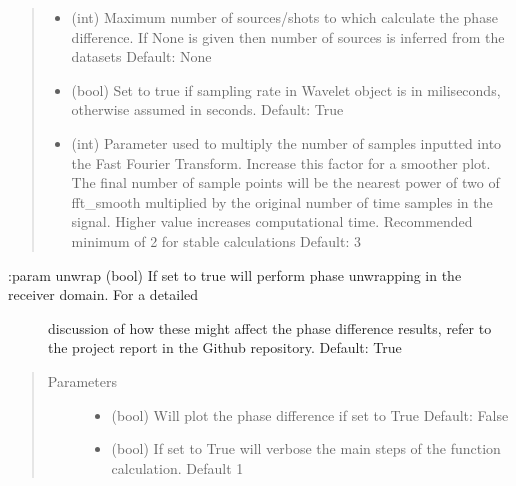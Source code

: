 \documentclass[letterpaper,10pt,english]{sphinxmanual}
\begin{document}
\begin{fulllineitems}
\begin{quote}
\begin{description}
\begin{itemize}
\item {} 
 \textendash{} (int)       Maximum number of sources/shots to which calculate the phase difference. If None is
given then number of sources is inferred from the datasets
Default: None

\item {} 
 \textendash{} (bool)      Set to true if sampling rate in Wavelet object is in miliseconds, otherwise assumed
in seconds.
Default: True

\item {} 
 \textendash{} (int)       Parameter used to multiply the number of samples inputted into the Fast Fourier
Transform. Increase this factor for a smoother plot. The final number of sample
points will be the nearest power of two of fft\_smooth multiplied by the original
number of time samples in the signal. Higher value increases computational time.
Recommended minimum of 2 for stable calculations
Default: 3

\end{itemize}

\end{description}\end{quote}
\begin{description}
\item[{:param unwrap       (bool)      If set to true will perform phase unwrapping in the receiver domain. For a detailed}] \leavevmode
discussion of how these might affect the phase difference results, refer to the
project report in the Github repository.
Default: True

\end{description}
\begin{quote}\begin{description}
\item[{Parameters}] \leavevmode\begin{itemize}
\item {} 
 \textendash{} (bool)      Will plot the phase difference if set to True
Default: False

\item {} 
 \textendash{} (bool)      If set to True will verbose the main steps of the function calculation. Default 1

\end{itemize}


\end{description}
\end{quote}
\end{fulllineitems}
\end{document}
